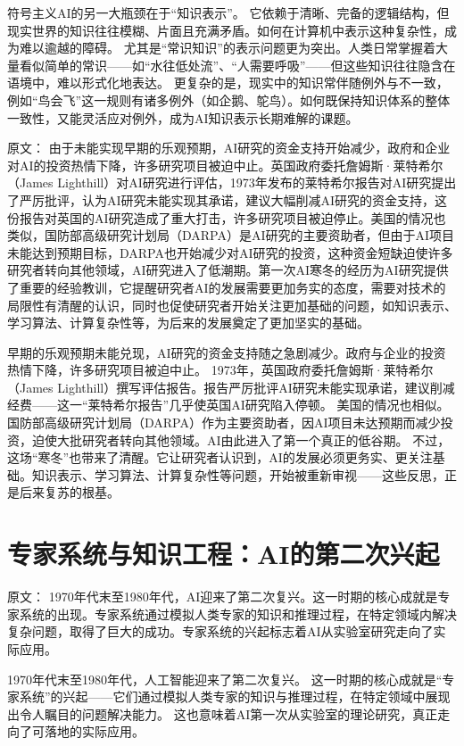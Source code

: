 符号主义AI的另一大瓶颈在于“知识表示”。  
它依赖于清晰、完备的逻辑结构，但现实世界的知识往往模糊、片面且充满矛盾。如何在计算机中表示这种复杂性，成为难以逾越的障碍。  
尤其是“常识知识”的表示问题更为突出。人类日常掌握着大量看似简单的常识——如“水往低处流”、“人需要呼吸”——但这些知识往往隐含在语境中，难以形式化地表达。  
更复杂的是，现实中的知识常伴随例外与不一致，例如“鸟会飞”这一规则有诸多例外（如企鹅、鸵鸟）。如何既保持知识体系的整体一致性，又能灵活应对例外，成为AI知识表示长期难解的课题。

原文：
由于未能实现早期的乐观预期，AI研究的资金支持开始减少，政府和企业对AI的投资热情下降，许多研究项目被迫中止。英国政府委托詹姆斯·莱特希尔（James Lighthill）对AI研究进行评估，1973年发布的莱特希尔报告对AI研究提出了严厉批评，认为AI研究未能实现其承诺，建议大幅削减AI研究的资金支持，这份报告对英国的AI研究造成了重大打击，许多研究项目被迫停止。美国的情况也类似，国防部高级研究计划局（DARPA）是AI研究的主要资助者，但由于AI项目未能达到预期目标，DARPA也开始减少对AI研究的投资，这种资金短缺迫使许多研究者转向其他领域，AI研究进入了低潮期。第一次AI寒冬的经历为AI研究提供了重要的经验教训，它提醒研究者AI的发展需要更加务实的态度，需要对技术的局限性有清醒的认识，同时也促使研究者开始关注更加基础的问题，如知识表示、学习算法、计算复杂性等，为后来的发展奠定了更加坚实的基础。

早期的乐观预期未能兑现，AI研究的资金支持随之急剧减少。政府与企业的投资热情下降，许多研究项目被迫中止。  
1973年，英国政府委托詹姆斯·莱特希尔（James Lighthill）撰写评估报告。报告严厉批评AI研究未能实现承诺，建议削减经费——这一“莱特希尔报告”几乎使英国AI研究陷入停顿。  
美国的情况也相似。国防部高级研究计划局（DARPA）作为主要资助者，因AI项目未达预期而减少投资，迫使大批研究者转向其他领域。AI由此进入了第一个真正的低谷期。  
不过，这场“寒冬”也带来了清醒。它让研究者认识到，AI的发展必须更务实、更关注基础。知识表示、学习算法、计算复杂性等问题，开始被重新审视——这些反思，正是后来复苏的根基。

\section{专家系统与知识工程：AI的第二次兴起}

原文：
1970年代末至1980年代，AI迎来了第二次复兴。这一时期的核心成就是专家系统的出现。专家系统通过模拟人类专家的知识和推理过程，在特定领域内解决复杂问题，取得了巨大的成功。专家系统的兴起标志着AI从实验室研究走向了实际应用。

1970年代末至1980年代，人工智能迎来了第二次复兴。  
这一时期的核心成就是“专家系统”的兴起——它们通过模拟人类专家的知识与推理过程，在特定领域中展现出令人瞩目的问题解决能力。  
这也意味着AI第一次从实验室的理论研究，真正走向了可落地的实际应用。

